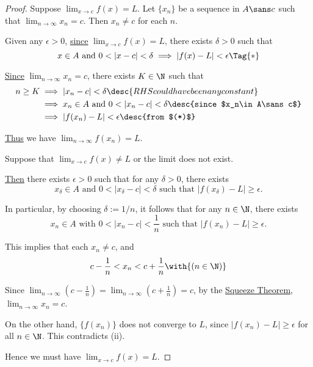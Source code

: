 \begin{proof}
  Suppose $\lim_{x\to c}f(x)=L$. Let $\{x_n\}$ be a sequence in $A\sans c$ such
  that $\lim_{n\to\infty}x_n=c$. Then $x_n\neq c$ for each $n$.

  Given any $\epsilon>0$, \href{d2d461a}{since} $\lim_{x\to c}f(x)=L$, there
  exists $\delta>0$ such that
  \begin{equation*}
    x\in A\text{ and }0<|x-c|<\delta\implies|f(x)-L|<\epsilon\Tag{*}
  \end{equation*}

  \href{e565120}{Since} $\lim_{n\to\infty}x_n=c$, there exists $K\in\N$ such
  that
  \begin{align*}
    n\geq K &\implies|x_n-c|<\delta\desc{RHS could have been any constant}               \\
            &\implies x_n\in A\text{ and }0<|x_n-c|<\delta\desc{since $x_n\in A\sans c$} \\
            &\implies|f(x_n)-L|<\epsilon\desc{from $(*)$}
  \end{align*}

  \href{e565120}{Thus} we have $\lim_{n\to\infty}f(x_n)=L$.

  Suppose that $\lim_{x\to c}f(x)\neq L$ or the limit does not exist.

  \href{cdbf269}{Then} there exists $\epsilon>0$ such that for any $\delta>0$,
  there exists
  $$
    x_\delta\in A\text{ and }0<|x_\delta-c|<\delta\text{ such that }|f(x_\delta)-L|\geq\epsilon.
  $$

  In particular, by choosing $\delta:=1/n$, it follows that for any $n\in\N$,
  there exists
  $$
    x_n\in A\text{ with }0<|x_n-c|<\frac1n\text{ such that }|f(x_n)-L|\geq\epsilon.
  $$

  This implies that each $x_n\neq c$, and
  $$
    c-\frac1n<x_n<c+\frac1n\with{(n\in\N)}
  $$

  Since
  $\displaystyle\lim_{n\to\infty}(c-\tfrac1n)=\lim_{n\to\infty}(c+\tfrac1n)=c$,
  by the \href{c3364d9}{Squeeze Theorem},
  $\displaystyle\lim_{n\to\infty}x_n=c$.

  On the other hand, $\{f(x_n)\}$ does not converge to $L$, since
  $|f(x_n)-L|\geq\epsilon$ for all $n\in\N$. This contradicts (ii).

  Hence we must have $\displaystyle\lim_{x\to c}f(x)=L$.
\end{proof}
